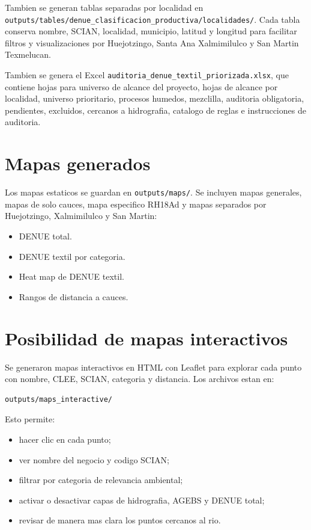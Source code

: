 \documentclass[11pt,letterpaper]{article}
\begin{document}
Tambien se generan tablas separadas por localidad en \texttt{outputs/tables/denue\_clasificacion\_productiva/localidades/}. Cada tabla conserva nombre, SCIAN, localidad, municipio, latitud y longitud para facilitar filtros y visualizaciones por Huejotzingo, Santa Ana Xalmimilulco y San Martin Texmelucan.

Tambien se genera el Excel \texttt{auditoria\_denue\_textil\_priorizada.xlsx}, que contiene hojas para universo de alcance del proyecto, hojas de alcance por localidad, universo prioritario, procesos humedos, mezclilla, auditoria obligatoria, pendientes, excluidos, cercanos a hidrografia, catalogo de reglas e instrucciones de auditoria.

\section{Mapas generados}

Los mapas estaticos se guardan en \texttt{outputs/maps/}. Se incluyen mapas generales, mapas de solo cauces, mapa especifico RH18Ad y mapas separados por Huejotzingo, Xalmimilulco y San Martin:

\begin{itemize}
  \item DENUE total.
  \item DENUE textil por categoria.
  \item Heat map de DENUE textil.
  \item Rangos de distancia a cauces.
\end{itemize}

\section{Posibilidad de mapas interactivos}

Se generaron mapas interactivos en HTML con Leaflet para explorar cada punto con nombre, CLEE, SCIAN, categoria y distancia. Los archivos estan en:

\begin{verbatim}
outputs/maps_interactive/
\end{verbatim}

Esto permite:

\begin{itemize}
  \item hacer clic en cada punto;
  \item ver nombre del negocio y codigo SCIAN;
  \item filtrar por categoria de relevancia ambiental;
  \item activar o desactivar capas de hidrografia, AGEBS y DENUE total;
  \item revisar de manera mas clara los puntos cercanos al rio.
\end{itemize}
\end{document}
